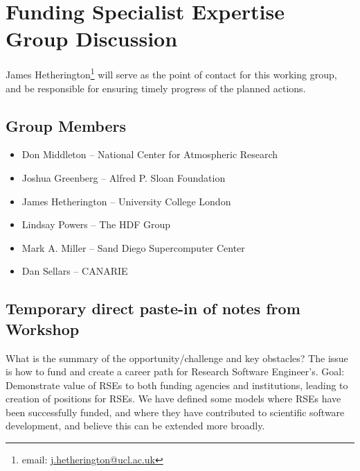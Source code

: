 \section{Funding Specialist Expertise Group Discussion}
\label{sec:appendix_funding_spec_expert}

James Hetherington\footnote{email: \href{mailto:j.hetherington@ucl.ac.uk}{j.hetherington@ucl.ac.uk}}
will serve as the point of contact for this working group, and be responsible for ensuring timely progress of the planned actions.

\subsection{Group Members}

\begin{itemize}
\item Don Middleton -- National Center for Atmospheric Research
\item Joshua Greenberg -- Alfred P. Sloan Foundation
\item James Hetherington -- University College London
\item Lindsay Powers -- The HDF Group
\item Mark A. Miller -- Sand Diego Supercomputer Center
\item Dan Sellars -- CANARIE
\end{itemize}

\subsection{Temporary direct paste-in of notes from Workshop}

What is the summary of the opportunity/challenge and key obstacles?
The issue is how to fund and create a career path for Research Software Engineer’s.
Goal: Demonstrate value of RSEs to both funding agencies and institutions, leading to creation of positions for RSEs.
 We have defined some models where RSEs have been successfully funded, and where they have contributed to scientific software development, and believe this can be extended more broadly.

